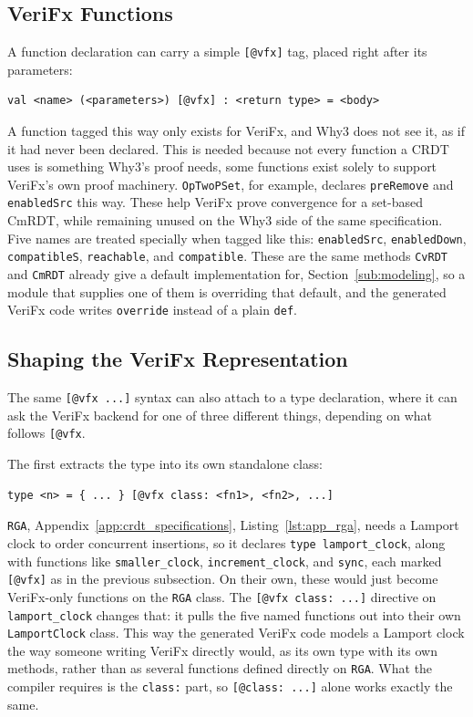 \subsection{VeriFx Functions}
\label{sub:vfx-functions}

A function declaration can carry a simple \texttt{[@vfx]} tag, placed right after its parameters:

\begin{verbatim}
val <name> (<parameters>) [@vfx] : <return type> = <body>
\end{verbatim}

A function tagged this way only exists for VeriFx, and Why3 does not see it, as if it had never been declared. This is
needed because not every function a CRDT uses is something Why3's proof needs, some functions exist solely to support
VeriFx's own proof machinery. \texttt{OpTwoPSet}, for example, declares \texttt{preRemove} and \texttt{enabledSrc} this way.
These help VeriFx prove convergence for a set-based CmRDT, while remaining unused on the Why3 side of the same
specification. Five names are treated specially when tagged like this: \texttt{enabledSrc}, \texttt{enabledDown},
\texttt{compatibleS}, \texttt{reachable}, and \texttt{compatible}. These are the same methods \texttt{CvRDT} and
\texttt{CmRDT} already give a default implementation for, Section~\ref{sub:modeling}, so a module that supplies one of
them is overriding that default, and the generated VeriFx code writes \texttt{override} instead of a plain \texttt{def}.

\subsection{Shaping the VeriFx Representation}
\label{sub:vfx-class}

The same \texttt{[@vfx ...]} syntax can also attach to a type declaration, where it can ask the VeriFx backend for one of
three different things, depending on what follows \texttt{[@vfx}.

The first extracts the type into its own standalone class:

\begin{verbatim}
type <n> = { ... } [@vfx class: <fn1>, <fn2>, ...]
\end{verbatim}

\texttt{RGA}, Appendix~\ref{app:crdt_specifications}, Listing~\ref{lst:app_rga}, needs a Lamport clock to order concurrent
insertions, so it declares \texttt{type lamport\_clock}, along with functions like \texttt{smaller\_clock},
\texttt{increment\_clock}, and \texttt{sync}, each marked \texttt{[@vfx]} as in the previous subsection. On their own,
these would just become VeriFx-only functions on the \texttt{RGA} class. The \texttt{[@vfx class: ...]} directive on
\texttt{lamport\_clock} changes that: it pulls the five named functions out into their own \texttt{LamportClock} class.
This way the generated VeriFx code models a Lamport clock the way someone writing VeriFx directly would, as its own type
with its own methods, rather than as several functions defined directly on \texttt{RGA}. What the compiler requires is
the \texttt{class:} part, so \texttt{[@class: ...]} alone works exactly the same.

